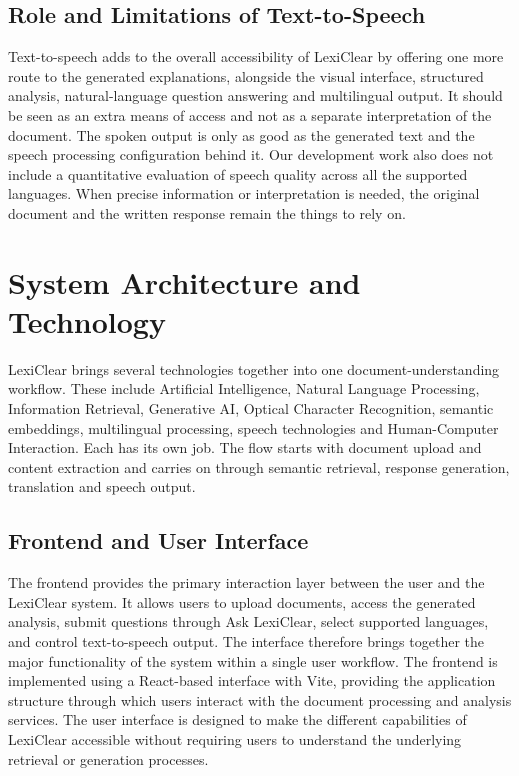 \documentclass[12pt,a4paper,oneside]{report}
\begin{document}
\subsection{Role and Limitations of Text-to-Speech}

Text-to-speech adds to the overall accessibility of LexiClear by offering one more route to the generated explanations, alongside the visual interface, structured analysis, natural-language question answering and multilingual output. It should be seen as an extra means of access and not as a separate interpretation of the document. The spoken output is only as good as the generated text and the speech processing configuration behind it. Our development work also does not include a quantitative evaluation of speech quality across all the supported languages. When precise information or interpretation is needed, the original document and the written response remain the things to rely on.

\section{System Architecture and Technology}

LexiClear brings several technologies together into one document-understanding workflow. These include Artificial Intelligence, Natural Language Processing, Information Retrieval, Generative AI, Optical Character Recognition, semantic embeddings, multilingual processing, speech technologies and Human-Computer Interaction. Each has its own job. The flow starts with document upload and content extraction and carries on through semantic retrieval, response generation, translation and speech output.

\subsection{Frontend and User Interface}

The frontend provides the primary interaction layer between the user and the
LexiClear system. It allows users to upload documents, access the generated
analysis, submit questions through Ask LexiClear, select supported languages,
and control text-to-speech output. The interface therefore brings together
the major functionality of the system within a single user workflow. The
frontend is implemented using a React-based interface with Vite, providing
the application structure through which users interact with the document
processing and analysis services. The user interface is designed to make the
different capabilities of LexiClear accessible without requiring users to
understand the underlying retrieval or generation processes.
\end{document}
